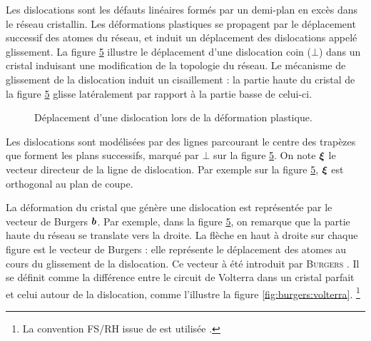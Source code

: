 \documentclass[11pt,class=article,float=false,crop=false]{standalone}
\begin{document}
Les dislocations sont les défauts linéaires formés par un demi-plan en excès dans le réseau cristallin. Les déformations plastiques se propagent par le déplacement successif des atomes du réseau, et induit un déplacement des dislocations appelé glissement. La figure \ref{fig:propagation_dislocation} illustre le déplacement d'une dislocation coin ($\bot$) dans un cristal induisant une modification de la topologie du réseau. Le mécanisme de glissement de la dislocation induit un cisaillement : la partie haute du cristal de la figure \ref{fig:propagation_dislocation} glisse latéralement par rapport à la partie basse de celui-ci.

\shorthandoff{:}%
\usetikzlibrary{arrows}
\shorthandon{:}%
\begin{figure}[H]
	\centering
	\begin{subfigure}[b]{0.24\textwidth}
		\centering
		\label{fig:propagation_dislocation:1}
	\end{subfigure}
	\begin{subfigure}[b]{0.24\textwidth}
		\centering
		\label{fig:propagation_dislocation:2}
	\end{subfigure}
	\begin{subfigure}[b]{0.24\textwidth}
		\centering
		\label{fig:propagation_dislocation:3}
	\end{subfigure}
	\begin{subfigure}[b]{0.24\textwidth}
		\centering
		\label{fig:propagation_dislocation:4}
	\end{subfigure}
	\caption{Déplacement d'une dislocation lors de la déformation plastique.}
	\label{fig:propagation_dislocation}
\end{figure}

Les dislocations sont modélisées par des lignes parcourant le centre des trapèzes que forment les plans successifs, marqué par $\bot$ sur la figure \ref{fig:propagation_dislocation}. On note $\bm{\xi}$ le vecteur directeur de la ligne de dislocation. Par exemple sur la figure \ref{fig:propagation_dislocation}, $\bm{\xi}$ est orthogonal au plan de coupe. 

La déformation du cristal que génère une dislocation est représentée par le vecteur de Burgers $\bm{b}$. Par exemple, dans la figure \ref{fig:propagation_dislocation}, on remarque que la partie haute du réseau se translate vers la droite. La flèche en haut à droite sur chaque figure est le vecteur de Burgers : elle représente le déplacement des atomes au cours du glissement de la dislocation. Ce vecteur à été introduit par \textsc{Burgers}  . Il se définit comme la différence entre le circuit de Volterra dans un cristal parfait et celui autour de la dislocation, comme l'illustre la figure \ref{fig:burgers:volterra}. \footnote{La convention FS/RH issue de  est utilisée .}
\end{document}
